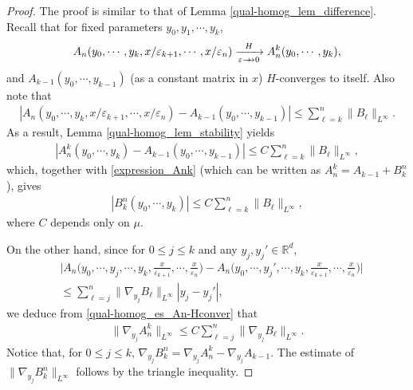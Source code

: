 \documentclass[reqno,12pt]{amsart} %
\theoremstyle{definition}
\theoremstyle{remark}
\numberwithin{equation}{section}
\newcommand{\R}{\mathbb{R}}
\newcommand{\doublerightarrow}{%
  \mathrel{%
    \mathchoice
      {\rightarrow\mspace{-10mu}\rightarrow} %
      {\rightarrow\mspace{-10mu}\rightarrow} %
      {\rightarrow\mspace{-10mu}\rightarrow} %
      {\rightarrow\mspace{-10mu}\rightarrow} %
  }%
}
\begin{document}
\begin{proof}
  The proof is similar to that of Lemma \ref{qual-homog_lem_difference}. Recall that for fixed parameters $y_0, y_1, \cdots, y_k$,
  \begin{align}\label{qual-homog_es_An-Hconver}
    A_n(y_0, \cdots, y_k, x/\varepsilon_{k+1}, \cdots, x/\varepsilon_n)\xrightarrow[\varepsilon\doublerightarrow 0]{H} A_n^k(y_0, \cdots, y_k),
  \end{align}
  and $A_{k-1}(y_0, \cdots, y_{k-1})$ (as a constant matrix in $x$) $H$-converges to itself. Also note that
  \begin{align*}
    |A_n(y_0, \cdots, y_k, x/\varepsilon_{k+1}, \cdots, x/\varepsilon_n)-A_{k-1}(y_0, \cdots, y_{k-1})|\leq \sum_{\ell=k}^n\|B_\ell\|_{L^\infty}.
  \end{align*}
  As a result, Lemma \ref{qual-homog_lem_stability} yields
  \begin{align*}
    |A_n^k(y_0, \cdots, y_k)-A_{k-1}(y_0, \cdots, y_{k-1})|\leq C\sum_{\ell=k}^n\|B_\ell\|_{L^\infty},
  \end{align*}
  which, together with \eqref{expression_Ank} (which can be written as $A^k_n = A_{k-1} + B^n_k$), gives
  \begin{align*}
    |B_k^n(y_0, \cdots, y_k)|\leq C\sum_{\ell=k}^n\|B_\ell\|_{L^\infty},
  \end{align*}
  where $C$ depends only on $\mu$.

  On the other hand, since for $0\leq j\leq k$ and any $y_j, y_j' \in \R^d$,
  \begin{align*}
    &\Big|A_n\Big(y_0, \cdots, y_j,\cdots, y_k, \frac{x}{\varepsilon_{k+1}}, \cdots, \frac{x}{\varepsilon_n}\Big)-A_n\Big(y_0, \cdots, y_j', \cdots, y_k, \frac{x}{\varepsilon_{k+1}}, \cdots, \frac{x}{\varepsilon_n}\Big)\Big|\\&\leq \sum_{\ell=j}^n\|\nabla_{y_j}B_\ell\|_{L^\infty}|y_j-y_j'|,
  \end{align*}
  we deduce from \eqref{qual-homog_es_An-Hconver} that
  \begin{align*}
    \|\nabla_{y_j}A_n^k\|_{L^\infty}\leq C\sum_{\ell=j}^n\|\nabla_{y_j}B_\ell\|_{L^\infty}. 
  \end{align*}
Notice that, for $0\leq j\leq k$, $\nabla_{y_j}B_k^n=\nabla_{y_j}A_n^k-\nabla_{y_j}A_{k-1}$. The estimate of $\|\nabla_{y_j}B_k^n\|_{L^\infty}$ follows by the triangle inequality. 
\end{proof}
\end{document}
